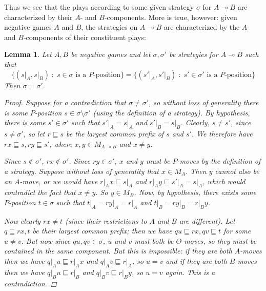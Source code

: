 \documentclass[11pt]{article} %
\theoremstyle{plain} %
\newtheorem{lemma}[theorem]{Lemma}
\theoremstyle{definition} %
\theoremstyle{exercisestyle}
\renewcommand{\implies}{\multimap}
\newcommand{\suchthat}{\;\colon\;}
\newcommand{\prefix}{\sqsubseteq}
\begin{document}
Thus we see that the plays according to some given strategy $\sigma$ for $A\implies B$ are characterized by their $A$- and $B$-components.  More is true, however: given negative games $A$ and $B$, the strategies on $A\implies B$ are characterized by the $A$- and $B$-components of their constituent plays:
\begin{lemma}
  \label{HylandSchalkFaithful}
  Let $A,B$ be negative games and let $\sigma,\sigma'$ be strategies for $A\implies B$ such that
  \[
    \{(s\vert_A,s\vert_B)\suchthat \textrm{$s\in\sigma$ is a $P$-position}\}=\{(s'\vert_A,s'\vert_B)\suchthat\textrm{$s'\in\sigma'$ is a $P$-position}\}
    \]
  Then $\sigma=\sigma'$.
  \begin{proof}
    Suppose for a contradiction that $\sigma\ne\sigma'$, so without loss of generality there is some $P$-position $s\in\sigma\setminus\sigma'$ (using the definition of a strategy).  By hypothesis, there is some $s'\in\sigma'$ such that $s'\vert_A=s\vert_A$ and $s'\vert_B=s\vert_B$.  Clearly, $s\ne s'$, since $s\ne\sigma'$, so let $r\prefix s$ be the largest common prefix of $s$ and $s'$.  We therefore have $rx\prefix s,ry\prefix s'$, where $x,y\in M_{A\implies B}$ and $x\ne y$.  

    Since $s\not\in\sigma'$, $rx\not\in\sigma'$.  Since $ry\in\sigma'$, $x$ and $y$ must be $P$-moves by the definition of a strategy.  Suppose without loss of generality that $x\in M_A$.  Then $y$ cannot also be an $A$-move, or we would have $r\vert_Ax\prefix s\vert_A$ and $r\vert_Ay\prefix s'\vert_A=s\vert_A$, which would contradict the fact that $x\ne y$.  So $y\in M_B$.  Now, by hypothesis, there exists some $P$-position $t\in\sigma$ such that $t\vert_A=ry\vert_A=r\vert_A$ and $t\vert_B=ry\vert_B=r\vert_By$.

    Now clearly $rx\ne t$ (since their restrictions to $A$ and $B$ are different).  Let $q\prefix rx, t$ be their largest common prefix; then we have $qu\prefix rx, qv\prefix t$ for some $u\ne v$.  But now since $qu, qv\in\sigma$, $u$ and $v$ must both be $O$-moves, so they must be contained in the same component.  But this is impossible: if they are both $A$-moves then we have $q\vert_Au\prefix r\vert_Ax$ and $q\vert_Av\prefix r\vert_A$, so $u=v$ and if they are both $B$-moves then we have $q\vert_Bu\prefix r\vert_B$ and $q\vert_Bv\prefix r\vert_By$, so $u=v$ again.  This is a contradiction.
  \end{proof}
\end{lemma}
\end{document}
